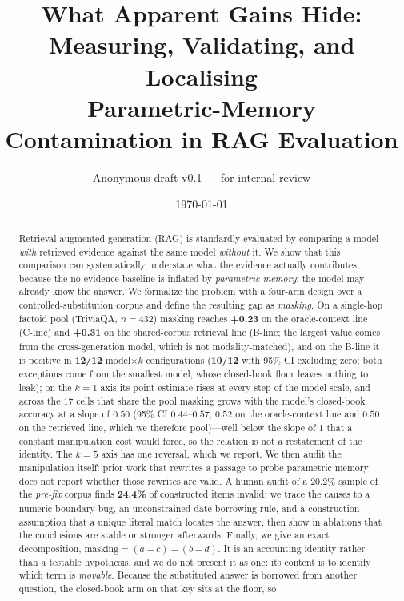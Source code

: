 \documentclass[11pt]{article}
\title{\textbf{What Apparent Gains Hide:\\ Measuring, Validating, and Localising\\ Parametric-Memory Contamination in RAG Evaluation}}
\author{Anonymous draft v0.1 --- for internal review}
\date{\today}
\newcommand{\mask}{\ensuremath{\mathrm{masking}}}
\begin{document}
\maketitle

\begin{abstract}
Retrieval-augmented generation (RAG) is standardly evaluated by comparing a model
\emph{with} retrieved evidence against the same model \emph{without} it. We show that
this comparison can systematically understate what the evidence actually contributes,
because the no-evidence baseline is inflated by \emph{parametric memory}: the model may
already know the answer. We formalize the problem with a four-arm design over a
controlled-substitution corpus and define the resulting gap as \emph{masking}. On a
single-hop factoid pool (TriviaQA, $n{=}432$) masking reaches \textbf{+0.23} on the
oracle-context line (C-line) and \textbf{+0.31} on the shared-corpus retrieval line
(B-line; the largest value comes from the cross-generation model, which is not
modality-matched), and on the B-line it is positive in \textbf{12/12} model$\times k$
configurations (\textbf{10/12} with 95\% CI excluding zero; both exceptions come from the
smallest model, whose closed-book floor leaves nothing to leak); on the $k{=}1$ axis its point estimate rises at every step of the model scale,
and across the $17$ cells that share the pool masking grows with the model's
closed-book accuracy at a slope of $0.50$ (95\% CI $0.44$--$0.57$; $0.52$ on the
oracle-context line and $0.50$ on the retrieved line, which we therefore pool)---well
below the slope of $1$ that a constant manipulation cost would force, so the relation is
not a restatement of the identity. The $k{=}5$ axis has one reversal, which we report.
We then audit the manipulation itself: prior work that rewrites a passage to probe
parametric memory does not report whether those rewrites are valid. A human audit of a 20.2\% sample of the \emph{pre-fix}
corpus finds \textbf{24.4\%} of
constructed items invalid; we trace the causes to a numeric boundary bug, an unconstrained
date-borrowing rule, and a construction assumption that a unique literal match locates the
answer, then show in ablations that the conclusions are stable or stronger afterwards.
Finally, we give an exact decomposition, $\mask=(a-c)-(b-d)$. It is an accounting identity
rather than a testable hypothesis, and we do not present it as one: its content is to
identify which term is \emph{movable}. Because the substituted answer
is borrowed from another question, the closed-book arm on that key sits at the floor, so

\end{abstract}
\end{document}
